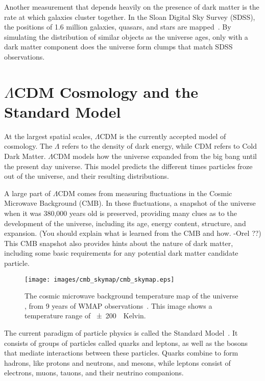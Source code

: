     Another measurement that depends heavily on the presence of dark matter is the rate at which galaxies cluster together.
    In the Sloan Digital Sky Survey (SDSS), the positions of 1.6 million galaxies, quasars, and stars are mapped~\cite{sdss_release}.
    By simulating the distribution of similar objects as the universe ages, only with a dark matter component does the universe form clumps that match SDSS observations.
  
    
    

\section{$\Lambda$CDM Cosmology and the Standard Model}

  At the largest spatial scales, $\Lambda$CDM is the currently accepted model of cosmology.
  The $\Lambda$ refers to the density of dark energy, while CDM refers to Cold Dark Matter.
  $\Lambda$CDM models how the universe expanded from the big bang until the present day universe.
  This model predicts the different times particles froze out of the universe, and their resulting distributions.

  A large part of $\Lambda$CDM comes from measuring fluctuations in the Cosmic Microwave Background (CMB).
  In these fluctuations, a snapshot of the universe when it was 380,000 years old is preserved, providing many clues as to the development of the universe, including its age, energy content, structure, and expansion. 
  {\color{red}(You should explain what is learned from the CMB and how. -Orel ??)}
  This CMB snapshot also provides hints about the nature of dark matter, including some basic requirements for any potential dark matter candidate particle.

  \begin{figure}[ht]
    \texttt{[image: images/cmb\_skymap/cmb\_skymap.eps]}
    \caption[The Cosmic Microwave Background]{
      The cosmic microwave background temperature map of the universe \cite{wmap_skymap}, from 9 years of WMAP observations~\cite{wmap9year}.
      This image shows a temperature range of \SI{\pm200}{\mu{}Kelvin}.
    }
    \label{fig:cmb}
  \end{figure}

  The current paradigm of particle physics is called the Standard Model~\cite{standardmodel}.
  It consists of groups of particles called quarks and leptons, as well as the bosons that mediate interactions between these particles.
  Quarks combine to form hadrons, like protons and neutrons, and mesons, while leptons consist of electrons, muons, tauons, and their neutrino companions.

